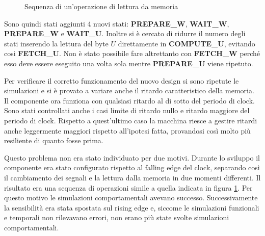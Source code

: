 \begin{figure}[!ht]
    \centering
    \caption{Sequenza di un'operazione di lettura da memoria}
    \label{fig:letturamemoria}
\end{figure}

Sono quindi stati aggiunti 4 nuovi stati: \textbf{PREPARE\_W}, \textbf{WAIT\_W}, \textbf{PREPARE\_W} e \textbf{WAIT\_U}. Inoltre si è cercato di ridurre il numero degli stati inserendo la lettura del byte $U$ direttamente in \textbf{COMPUTE\_U}, evitando così \textbf{FETCH\_U}. Non è stato possibile fare altrettanto con \textbf{FETCH\_W} perché esso deve essere eseguito una volta sola mentre \textbf{PREPARE\_U} viene ripetuto.

Per verificare il corretto funzionamento del nuovo design si sono ripetute le simulazioni e si è provato a variare anche il ritardo caratteristico della memoria. Il componente ora funziona con qualsiasi ritardo al di sotto del periodo di clock. Sono stati controllati anche i casi limite di ritardo nullo e ritardo maggiore del periodo di clock. Rispetto a quest'ultimo caso la macchina riesce a gestire ritardi anche leggermente maggiori rispetto all'ipotesi fatta, provandosi così molto più resiliente di quanto fosse prima.

Questo problema non era stato individuato per due motivi. Durante lo sviluppo il componente era stato configurato rispetto al falling edge del clock, separando così il cambiamento dei segnali e la lettura dalla memoria in due momenti differenti. Il risultato era una sequenza di operazioni simile a quella indicata in figura \ref{fig:letturamemoria}. Per questo motivo le simulazioni comportamentali avevano successo. Successivamente la sensibilità era stata spostata sul rising edge e, siccome le simulazioni funzionali e temporali non rilevavano errori, non erano più state svolte simulazioni comportamentali.